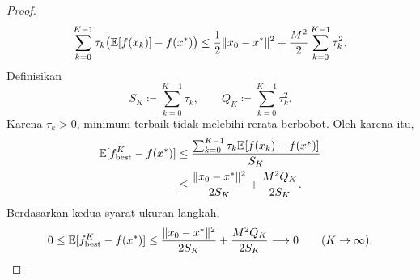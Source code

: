 \begin{proof}
    \begin{equation}
        \begin{aligned}
            \sum_{k=0}^{K-1}\tau_k\big(\mathbb{E}[f(x_k)]-f(x^*)\big)
            \leq \frac{1}{2}\|x_0-x^*\|^2
            +\frac{M^2}{2}\sum_{k=0}^{K-1}\tau_k^2.
        \end{aligned}
    \end{equation}
    Definisikan
    \begin{equation}
        S_K\coloneqq\sum_{k=0}^{K-1}\tau_k,
        \qquad
        Q_K\coloneqq\sum_{k=0}^{K-1}\tau_k^2.
    \end{equation}
    Karena $\tau_k>0$, minimum terbaik tidak melebihi rerata berbobot. Oleh karena itu,
    \begin{equation}
        \begin{aligned}
            \mathbb{E}[f_{\mathrm{best}}^K-f(x^*)]
            &\leq \frac{\sum_{k=0}^{K-1}\tau_k\mathbb{E}[f(x_k)-f(x^*)]}{S_K}\\
            &\leq \frac{\|x_0-x^*\|^2}{2S_K}
            +\frac{M^2Q_K}{2S_K}.
        \end{aligned}
    \end{equation}
    Berdasarkan kedua syarat ukuran langkah,
    \begin{equation}
        0\leq\mathbb{E}[f_{\mathrm{best}}^K-f(x^*)]
        \leq\frac{\|x_0-x^*\|^2}{2S_K}
        +\frac{M^2Q_K}{2S_K}
        \longrightarrow0
        \qquad(K\rightarrow\infty).
    \end{equation}
\end{proof}
